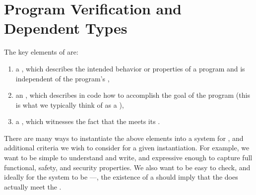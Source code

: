 \section{Program Verification and Dependent Types}
The key elements of  are:
\begin{enumerate}
  \item a , which describes the intended behavior or
    properties of a program and is independent of the program's ,
  \item an , which describes in code how to accomplish
    the goal of the program (this is what we typically think of as a ),
  \item a , which witnesses the fact that the
     meets its .
\end{enumerate}
There are many ways to instantiate the above elements into a system for
, and additional criteria we wish to consider for a
given instantiation.
For example, we want  to be simple to understand and write,
and expressive enough to capture full functional, safety, and security
properties.
We also want  to be easy to check, and ideally for the 
system to be ---\ie, the existence
of a
 should imply that the  does actually meet the
.

